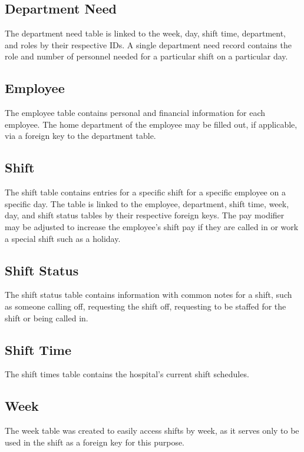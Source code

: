 \documentclass[letter,12pt]{texMemo}
\begin{document}
	\subsection*{Department Need}
		The department need table is linked to the week, day, shift time, department, and roles by their respective IDs. A single department need record contains the role and number of personnel needed for a particular shift on a particular day.
		
	\subsection*{Employee}
		The employee table contains personal and financial information for each employee. The home department of the employee may be filled out, if applicable, via a foreign key to the department table.
		
	\newpage	
	\subsection*{Shift}
		The shift table contains entries for a specific shift for a specific employee on a specific day. The table is linked to the employee, department, shift time, week, day, and shift status tables by their respective foreign keys. The pay modifier may be adjusted to increase the employee's shift pay if they are called in or work a special shift such as a holiday.
		
	\subsection*{Shift Status}
		The shift status table contains information with common notes for a shift, such as someone calling off, requesting the shift off, requesting to be staffed for the shift or being called in.
		
	\subsection*{Shift Time}
		The shift times table contains the hospital's current shift schedules.
		
	\newpage	
	\subsection*{Week}
		The week table was created to easily access shifts by week, as it serves only to be used in the shift as a foreign key for this purpose.
		
\end{document}
